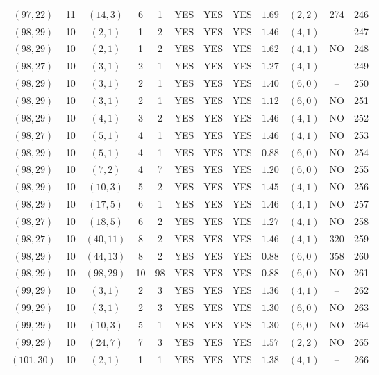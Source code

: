 \begin{longtable}{|c|c|c|c|c|c|c|c|c|c|c|c|}
$(97,22)$ & 11 & $(14,3)$ & 6 & 1 & YES & YES & YES & $1.69$ & $(2,2)$ & 274 & 246\\
$(98,29)$ & 10 & $(2,1)$ & 1 & 2 & YES & YES & YES & $1.46$ & $(4,1)$ & -- & 247\\
$(98,29)$ & 10 & $(2,1)$ & 1 & 2 & YES & YES & YES & $1.62$ & $(4,1)$ & NO & 248\\
$(98,27)$ & 10 & $(3,1)$ & 2 & 1 & YES & YES & YES & $1.27$ & $(4,1)$ & -- & 249\\
$(98,29)$ & 10 & $(3,1)$ & 2 & 1 & YES & YES & YES & $1.40$ & $(6,0)$ & -- & 250\\
$(98,29)$ & 10 & $(3,1)$ & 2 & 1 & YES & YES & YES & $1.12$ & $(6,0)$ & NO & 251\\
$(98,29)$ & 10 & $(4,1)$ & 3 & 2 & YES & YES & YES & $1.46$ & $(4,1)$ & NO & 252\\
$(98,27)$ & 10 & $(5,1)$ & 4 & 1 & YES & YES & YES & $1.46$ & $(4,1)$ & NO & 253\\
$(98,29)$ & 10 & $(5,1)$ & 4 & 1 & YES & YES & YES & $0.88$ & $(6,0)$ & NO & 254\\
$(98,29)$ & 10 & $(7,2)$ & 4 & 7 & YES & YES & YES & $1.20$ & $(6,0)$ & NO & 255\\
$(98,29)$ & 10 & $(10,3)$ & 5 & 2 & YES & YES & YES & $1.45$ & $(4,1)$ & NO & 256\\
$(98,29)$ & 10 & $(17,5)$ & 6 & 1 & YES & YES & YES & $1.46$ & $(4,1)$ & NO & 257\\
$(98,27)$ & 10 & $(18,5)$ & 6 & 2 & YES & YES & YES & $1.27$ & $(4,1)$ & NO & 258\\
$(98,27)$ & 10 & $(40,11)$ & 8 & 2 & YES & YES & YES & $1.46$ & $(4,1)$ & 320 & 259\\
$(98,29)$ & 10 & $(44,13)$ & 8 & 2 & YES & YES & YES & $0.88$ & $(6,0)$ & 358 & 260\\
$(98,29)$ & 10 & $(98,29)$ & 10 & 98 & YES & YES & YES & $0.88$ & $(6,0)$ & NO & 261\\
$(99,29)$ & 10 & $(3,1)$ & 2 & 3 & YES & YES & YES & $1.36$ & $(4,1)$ & -- & 262\\
$(99,29)$ & 10 & $(3,1)$ & 2 & 3 & YES & YES & YES & $1.30$ & $(6,0)$ & NO & 263\\
$(99,29)$ & 10 & $(10,3)$ & 5 & 1 & YES & YES & YES & $1.30$ & $(6,0)$ & NO & 264\\
$(99,29)$ & 10 & $(24,7)$ & 7 & 3 & YES & YES & YES & $1.57$ & $(2,2)$ & NO & 265\\
$(101,30)$ & 10 & $(2,1)$ & 1 & 1 & YES & YES & YES & $1.38$ & $(4,1)$ & -- & 266\\

\end{longtable}
